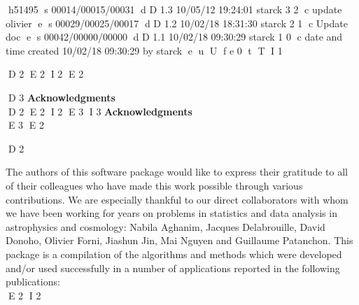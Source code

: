 h51495
s 00014/00015/00031
d D 1.3 10/05/12 19:24:01 starck 3 2
c update olivier
e
s 00029/00025/00017
d D 1.2 10/02/18 18:31:30 starck 2 1
c Update doc
e
s 00042/00000/00000
d D 1.1 10/02/18 09:30:29 starck 1 0
c date and time created 10/02/18 09:30:29 by starck
e
u
U
f e 0
t
T
I 1

D 2
\newpage
E 2
I 2
\newpage
E 2
\thispagestyle{empty}
$ $
\newpage

D 3
{\Huge \bf Acknowledgments}\label{forewd}\\
D 2
\vspace{1cm}
E 2
I 2
E 3
I 3
{\Huge \bf Acknowledgments}
\label{forewd}\\
E 3
\vspace{1cm}
E 2
D 2

The authors of this software package would like to express their 
gratitude to all of their colleagues who have made this work  
possible through various contributions. 
We are especially thankful to our direct collaborators with whom we 
have been working for years on problems in statistics and data 
analysis in astrophysics and cosmology: Nabila Aghanim, Jacques Delabrouille, David Donoho, 
Olivier Forni, Jiashun Jin, Mai Nguyen and Guillaume Patanchon.
This package is a compilation of the algorithms and methods which were 
developed and/or used successfully in a number of applications 
reported in the following publications: \\
E 2
I 2

